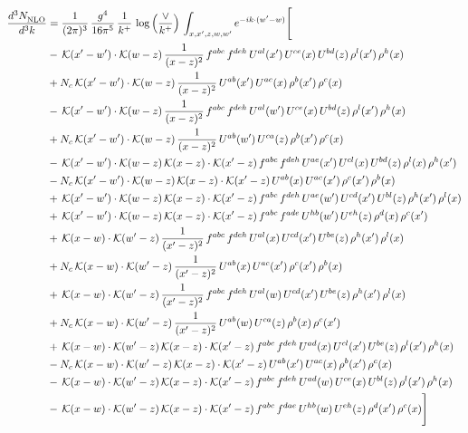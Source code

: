 \documentclass[9pt]{article}
\numberwithin{equation}{section}
\begin{document}
\begin{align}
    \frac{d^{3}N_{\rm NLO}^{\rm}}{d^{3}k}  & = \frac{1}{(2\pi)^{3}}\,\frac{g^{4}}{16\pi^{5}}\,\frac{1}{k^{+}}\,\log{\left(\frac{\vee}{k^{+}}\right)}\, \int_{x,x',z,w,w'}e^{-ik\cdot(w'-w)}\Bigg[\notag\\ &
    -\,\mathcal{K}(x'-w')\cdot\mathcal{K}(w-z)\,\frac{1}{(x-z)^{2}}\,f^{abc}\,f^{deh}\,U^{al}(x')\,U^{ce}(x)\,U^{bd}(z)\,\rho^{l}(x')\,\rho^{h}(x)\notag \\ 
&+N_{c}\,\mathcal{K}(x'-w')\cdot\mathcal{K}(w-z)\,\frac{1}{(x-z)^{2}}\,U^{ab}(x')\,U^{ac}(x)\,\rho^{b}(x')\,\rho^{c}(x)\notag \\ 
&-\,\mathcal{K}(x'-w')\cdot\mathcal{K}(w-z)\,\frac{1}{(x-z)^{2}}\,f^{abc}\,f^{deh}\,U^{al}(w')\,U^{ce}(x)\,U^{bd}(z)\,\rho^{l}(x')\,\rho^{h}(x)\notag \\ 
&+N_{c}\,\mathcal{K}(x'-w')\cdot\mathcal{K}(w-z)\,\frac{1}{(x-z)^{2}}\,U^{ab}(w')\,U^{ca}(z)\,\rho^{b}(x')\,\rho^{c}(x)\notag \\ 
&-\,\mathcal{K}(x'-w')\cdot\mathcal{K}(w-z)\,\mathcal{K}(x-z)\cdot\mathcal{K}(x'-z)\,f^{abc}\,f^{deh}\,U^{ae}(x')\,U^{cl}(x)\,U^{bd}(z)\,\rho^{l}(x)\,\rho^{h}(x')\notag \\ 
&-N_{c}\,\mathcal{K}(x'-w')\cdot\mathcal{K}(w-z)\,\mathcal{K}(x-z)\cdot\mathcal{K}(x'-z)\,U^{ab}(x)\,U^{ac}(x')\,\rho^{c}(x')\,\rho^{b}(x)\notag \\ 
&+\,\mathcal{K}(x'-w')\cdot\mathcal{K}(w-z)\,\mathcal{K}(x-z)\cdot\mathcal{K}(x'-z)\,f^{abc}\,f^{deh}\,U^{ae}(w')\,U^{cd}(x')\,U^{bl}(z)\,\rho^{h}(x')\,\rho^{l}(x)\notag \\ 
&+\,\mathcal{K}(x'-w')\cdot\mathcal{K}(w-z)\,\mathcal{K}(x-z)\cdot\mathcal{K}(x'-z)\,f^{abc}\,f^{ade}\,U^{hb}(w')\,U^{eh}(z)\,\rho^{d}(x)\,\rho^{c}(x')\notag \\ 
&+\,\mathcal{K}(x-w)\cdot\mathcal{K}(w'-z)\,\frac{1}{(x'-z)^{2}}\,f^{abc}\,f^{deh}\,U^{al}(x)\,U^{cd}(x')\,U^{be}(z)\,\rho^{h}(x')\,\rho^{l}(x)\notag \\ 
&+N_{c}\,\mathcal{K}(x-w)\cdot\mathcal{K}(w'-z)\,\frac{1}{(x'-z)^{2}}\,U^{ab}(x)\,U^{ac}(x')\,\rho^{c}(x')\,\rho^{b}(x)\notag \\ 
&+\,\mathcal{K}(x-w)\cdot\mathcal{K}(w'-z)\,\frac{1}{(x'-z)^{2}}\,f^{abc}\,f^{deh}\,U^{al}(w)\,U^{cd}(x')\,U^{be}(z)\,\rho^{h}(x')\,\rho^{l}(x)\notag \\ 
&+N_{c}\,\mathcal{K}(x-w)\cdot\mathcal{K}(w'-z)\,\frac{1}{(x'-z)^{2}}\,U^{ab}(w)\,U^{ca}(z)\,\rho^{b}(x)\,\rho^{c}(x')\notag \\ 
&+\,\mathcal{K}(x-w)\cdot\mathcal{K}(w'-z)\,\mathcal{K}(x-z)\cdot\mathcal{K}(x'-z)\,f^{abc}\,f^{deh}\,U^{ad}(x)\,U^{cl}(x')\,U^{be}(z)\,\rho^{l}(x')\,\rho^{h}(x)\notag \\ 
&-N_{c}\,\mathcal{K}(x-w)\cdot\mathcal{K}(w'-z)\,\mathcal{K}(x-z)\cdot\mathcal{K}(x'-z)\,U^{ab}(x')\,U^{ac}(x)\,\rho^{b}(x')\,\rho^{c}(x)\notag \\ 
&-\,\mathcal{K}(x-w)\cdot\mathcal{K}(w'-z)\,\mathcal{K}(x-z)\cdot\mathcal{K}(x'-z)\,f^{abc}\,f^{deh}\,U^{ad}(w)\,U^{ce}(x)\,U^{bl}(z)\,\rho^{l}(x')\,\rho^{h}(x)\notag \\ 
&-\,\mathcal{K}(x-w)\cdot\mathcal{K}(w'-z)\,\mathcal{K}(x-z)\cdot\mathcal{K}(x'-z)\,f^{abc}\,f^{dae}\,U^{hb}(w)\,U^{eh}(z)\,\rho^{d}(x')\,\rho^{c}(x)\Bigg]
\end{align}
\end{document}
